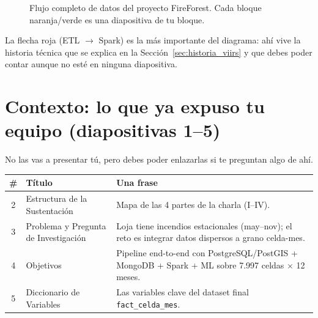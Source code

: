\documentclass[11pt,a4paper]{article}
\begin{document}
\begin{figure}[H]
\caption{Flujo completo de datos del proyecto FireForest. Cada bloque naranja/verde es una diapositiva de tu bloque.}
\label{fig:maestro}
\end{figure}

\begin{datobox}
La flecha roja (ETL $\to$ Spark) es la m\'as importante del diagrama: ah\'i vive la historia t\'ecnica que se explica en la Secci\'on~\ref{sec:historia_viirs} y que debes poder contar aunque no est\'e en ninguna diapositiva.
\end{datobox}

\newpage
\section{Contexto: lo que ya expuso tu equipo (diapositivas 1--5)}

No las vas a presentar t\'u, pero debes poder enlazarlas si te preguntan algo de ah\'i.

\begin{table}[H]
\centering
\small
\begin{tabularx}{\textwidth}{@{}clX@{}}
\toprule
\textbf{\#} & \textbf{T\'itulo} & \textbf{Una frase} \\
\midrule
2 & Estructura de la Sustentaci\'on & Mapa de las 4 partes de la charla (I--IV). \\
3 & Problema y Pregunta de Investigaci\'on & Loja tiene incendios estacionales (may--nov); el reto es integrar datos dispersos a grano celda-mes. \\
4 & Objetivos & Pipeline end-to-end con PostgreSQL/PostGIS + MongoDB + Spark + ML sobre 7.997 celdas $\times$ 12 meses. \\
5 & Diccionario de Variables & Las variables clave del dataset final \texttt{fact\_celda\_mes}. \\
\bottomrule
\end{tabularx}
\end{table}
\end{document}
